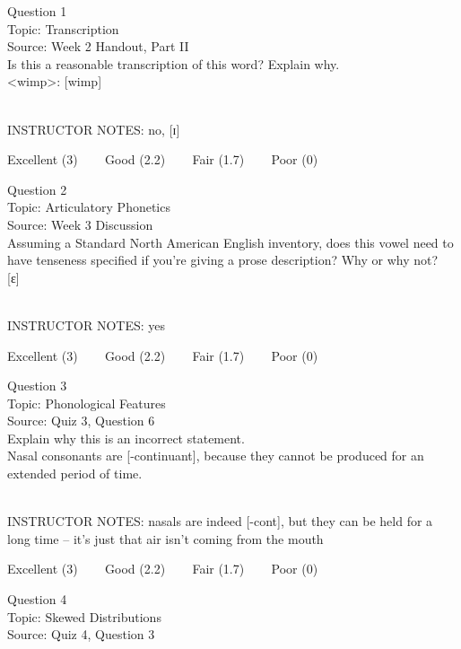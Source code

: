 \documentclass[12pt]{article}
\begin{document}
{\large Question 1}\\

Topic: Transcription\\
Source: Week 2 Handout, Part II\\

Is this a reasonable transcription of this word? Explain why.\\

<wimp>: {[wimp]}


~\\
INSTRUCTOR NOTES: no, [ɪ]


\vfill
Excellent (3) ~~~ Good (2.2) ~~~ Fair (1.7) ~~~ Poor (0)
\newpage

{\large Question 2}\\

Topic: Articulatory Phonetics\\
Source: Week 3 Discussion\\

Assuming a Standard North American English inventory, does this vowel need to have tenseness specified if you're giving a prose description? Why or why not?\\

{[ɛ]}


~\\
INSTRUCTOR NOTES: yes


\vfill
Excellent (3) ~~~ Good (2.2) ~~~ Fair (1.7) ~~~ Poor (0)
\newpage

{\large Question 3}\\

Topic: Phonological Features\\
Source: Quiz 3, Question 6\\

Explain why this is an incorrect statement.\\

Nasal consonants are {[-continuant]}, because they cannot be produced for an extended period of time.


~\\
INSTRUCTOR NOTES: nasals are indeed [-cont], but they can be held for a long time -- it's just that air isn't coming from the mouth


\vfill
Excellent (3) ~~~ Good (2.2) ~~~ Fair (1.7) ~~~ Poor (0)
\newpage

{\large Question 4}\\

Topic: Skewed Distributions\\
Source: Quiz 4, Question 3\\
\end{document}
